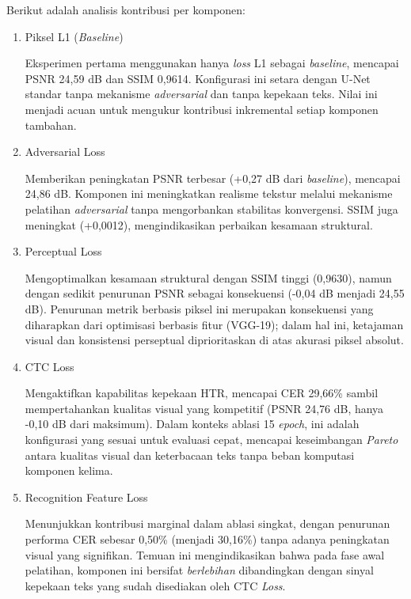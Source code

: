 Berikut adalah analisis kontribusi per komponen:
\begin{enumerate}[leftmargin=1.5em, labelsep=0.5em, itemindent=0pt, label=\arabic*., leftmargin=0.8cm, topsep=0pt, partopsep=0pt]
\item Piksel L1 (\textit{Baseline})

Eksperimen pertama menggunakan hanya \textit{loss} L1 sebagai \textit{baseline}, mencapai PSNR 24,59 dB dan SSIM 0,9614. Konfigurasi ini setara dengan U-Net standar tanpa mekanisme \textit{adversarial} dan tanpa kepekaan teks. Nilai ini menjadi acuan untuk mengukur kontribusi inkremental setiap komponen tambahan.

\item Adversarial Loss

Memberikan peningkatan PSNR terbesar (+0,27 dB dari \textit{baseline}), mencapai 24,86 dB. Komponen ini meningkatkan realisme tekstur melalui mekanisme pelatihan \textit{adversarial} tanpa mengorbankan stabilitas konvergensi. SSIM juga meningkat (+0,0012), mengindikasikan perbaikan kesamaan struktural.

\item Perceptual Loss

Mengoptimalkan kesamaan struktural dengan SSIM tinggi (0,9630), namun dengan sedikit penurunan PSNR sebagai konsekuensi (-0,04 dB menjadi 24,55 dB). Penurunan metrik berbasis piksel ini merupakan konsekuensi yang diharapkan dari optimisasi berbasis fitur (VGG-19); dalam hal ini, ketajaman visual dan konsistensi perseptual diprioritaskan di atas akurasi piksel absolut.

\item CTC Loss

Mengaktifkan kapabilitas kepekaan HTR, mencapai CER 29,66\% sambil mempertahankan kualitas visual yang kompetitif (PSNR 24,76 dB, hanya -0,10 dB dari maksimum). Dalam konteks ablasi 15 \textit{epoch}, ini adalah konfigurasi yang sesuai untuk evaluasi cepat, mencapai keseimbangan \textit{Pareto} antara kualitas visual dan keterbacaan teks tanpa beban komputasi komponen kelima.

\item Recognition Feature Loss

Menunjukkan kontribusi marginal dalam ablasi singkat, dengan penurunan performa CER sebesar 0,50\% (menjadi 30,16\%) tanpa adanya peningkatan visual yang signifikan. Temuan ini mengindikasikan bahwa pada fase awal pelatihan, komponen ini bersifat \textit{berlebihan} dibandingkan dengan sinyal kepekaan teks yang sudah disediakan oleh CTC \textit{Loss}.

\end{enumerate}

